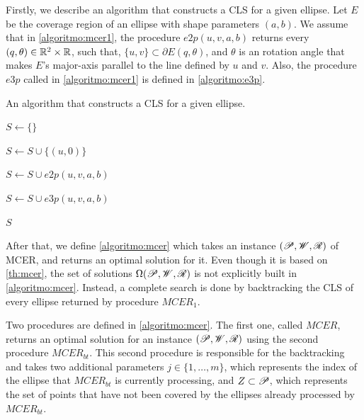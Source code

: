 Firstly, we describe an algorithm that constructs a CLS for a given ellipse.
Let $E$ be the coverage region of an ellipse with shape parameters $(a, b)$. We assume that in \autoref{algoritmo:mcer1}, the procedure $e2p(u, v, a, b)$ returns every $(q, \theta) \in \mathbb{R}^2\times\mathbb{R}$, such that, $\{u, v\}\subset \partial E(q, \theta)$, and $\theta$ is an rotation angle that makes $E$'s major-axis parallel to the line defined by $u$ and $v$. Also, the procedure $e3p$ called in \autoref{algoritmo:mcer1} is defined in \autoref{algoritmo:e3p}.

\begin{algoritmo}
	\caption{An algorithm that constructs a CLS for a given ellipse.}\label{algoritmo:mcer1}
	\begin{algorithmic}[1]
		
		
		\item[]
		
		\State $S \gets \{\}$
		
		\State $S \gets S \cup \{(u, 0)\}$
		\EndFor
		
		\State $S \gets S \cup e2p(u, v, a, b)$
		\EndFor
		
		\State $S \gets S \cup e3p(u, v, a, b)$ 
		\EndFor
		
		\State \Return $S$
		\EndProcedure
	\end{algorithmic}
\end{algoritmo}

After that, we define \autoref{algoritmo:mcer} which takes an instance $(\mathscr{P}, \mathscr{W}, \mathscr{R})$ of MCER, and returns an optimal solution for it.
Even though it is based on \autoref{th:mcer}, the set of solutions $\Omega(\mathscr{P}, \mathscr{W}, \mathscr{R})$ is not explicitly built in \autoref{algoritmo:mcer}. Instead, a complete search is done by backtracking the CLS of every ellipse returned by procedure $MCER_1$.

Two procedures are defined in \autoref{algoritmo:mcer}. The first one, called $MCER$, returns an optimal solution for an instance $(\mathscr{P}, \mathscr{W}, \mathscr{R})$ using the second procedure $MCER_{bt}$. This second procedure is responsible for the backtracking and takes two additional parameters $j\in\{1, \dots, m\}$, which represents the index of the ellipse that $MCER_{bt}$ is currently processing, and $Z\subset \mathscr{P}$, which represents the set of points that have not been covered by the ellipses already processed by $MCER_{bt}$.


